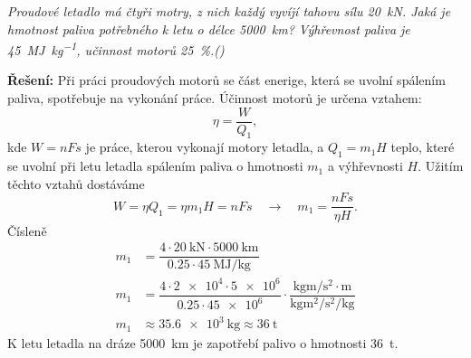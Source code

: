 \begin{mdframed}[style=mdexam]
  \begin{example}\label{FYZ:exam028}
    \emph{Proudové letadlo má čtyři motry, z nich každý vyvíjí tahovu sílu \qty{20}{\kN}. Jaká je
    hmotnost paliva potřebného k letu o délce \qty{5000}{\km}? Výhřevnost paliva je
    \qty{45}{\mega\joule\per\kg}, učinnost motorů \qty{25}{\percent}.(\cite[s.~32]{Bartuska1997})}  

    {\centering
    \captionsetup{type=figure}
    \par} 
    
    \textbf{Řešení:}\newline 
    Při práci proudových motorů se část enerige, která se uvolní spálením paliva, spotřebuje na
    vykonání práce. Účinnost motorů je určena vztahem:
    \begin{equation*}
      \eta = \dfrac{W}{Q_1},
    \end{equation*}
    kde \(W = nFs\) je práce, kterou vykonají motory letadla, a \(Q_1 = m_1H\) teplo, které se
    uvolní při letu letadla spálením paliva o hmotnosti \(m_1\) a výhřevnosti \(H\). Užitím těchto
    vztahů dostáváme
    \begin{equation*}
     W = \eta Q_1 = \eta m_1H = nFs \quad\rightarrow\quad m_1 = \dfrac{nFs}{\eta H}.
    \end{equation*}
    Čísleně 
    \begin{align*}
       m_1 &= \dfrac{4\cdot\qty{20}{\kN}\cdot\qty{5000}{\km}}
                    {\num{0.25}\cdot\qty{45}{\mega\joule\per\kg}}                                  \\
       m_1 &= \dfrac{4\cdot\num{2e4}\cdot\num{5e6}}{\num{0.25}\cdot\num{45e6}}\cdot
              \dfrac{\unit{\kg\m\per\square\s}\cdot\unit{\m}}{\unit{\kg\square\m\per\square\s\per\kg}}  \\
       m_1 &\approx \qty{35.6e3}{\kg} \approx \qty{36}{\tonne}        
     \end{align*}
     K letu letadla na dráze \qty{5000}{\km} je zapotřebí palivo o hmotnosti \qty{36}{\tonne}.
  \end{example} 
\end{mdframed}